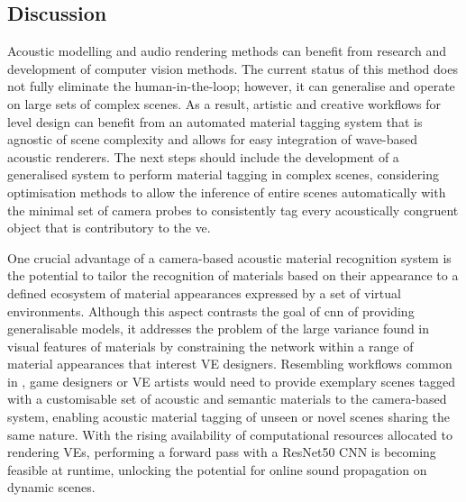 \subsection{Discussion}
Acoustic modelling and audio rendering methods can benefit from research and development of computer vision methods. The current status of this method does not fully eliminate the human-in-the-loop; however, it can generalise and operate on large sets of complex scenes. As a result, artistic and creative workflows for level design can benefit from an automated material tagging system that is agnostic of scene complexity and allows for easy integration of wave-based acoustic renderers.
The next steps should include the development of a generalised system to perform material tagging in complex scenes, considering optimisation methods to allow the inference of entire scenes automatically with the minimal set of camera probes to consistently tag every acoustically congruent object that is contributory to the \acrshort{ve}.\par
One crucial advantage of a camera-based acoustic material recognition system is the potential to tailor the recognition of materials based on their appearance to a defined ecosystem of material appearances expressed by a set of virtual environments. Although this aspect contrasts the goal of \acrshort{cnn} of providing generalisable models, it addresses the problem of the large variance found in visual features of materials by constraining the network within a range of material appearances that interest VE designers. Resembling workflows common in  \citep{mildenhall2020nerf}, game designers or VE artists would need to provide exemplary scenes tagged with a customisable set of acoustic and semantic materials to the camera-based system, enabling acoustic material tagging of unseen or novel scenes sharing the same nature. With the rising availability of computational resources allocated to rendering VEs, performing a forward pass with a ResNet50 CNN \citep{he2016deep} is becoming feasible at runtime, unlocking the potential for online sound propagation on dynamic scenes.\par

